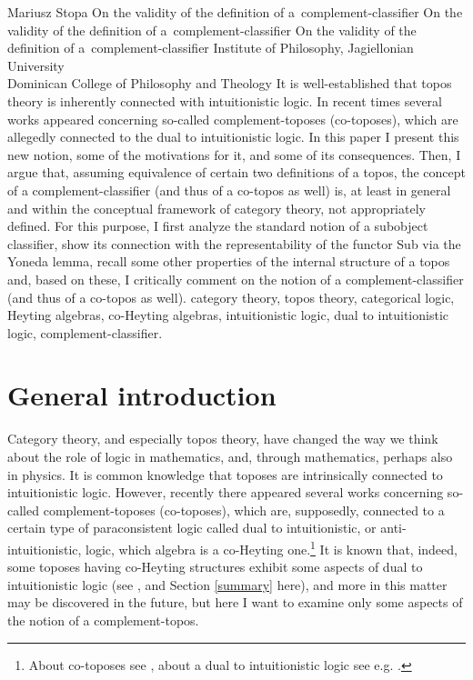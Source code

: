 

\begin{artengenv}{Mariusz Stopa}
	{On the validity of the definition of a~complement-classifier}
	{On the validity of the definition of a~complement-classifier}
	{On the validity of the definition of a~complement-classifier}
	{Institute of Philosophy, Jagiellonian University\\Dominican College of Philosophy and Theology}
	{It is well-established that topos theory is inherently connected with intuitionistic logic. In recent times several works appeared concerning so-called com\-ple\-ment-toposes (co-toposes), which are allegedly connected to the dual to intuitionistic logic. In this paper I present this new notion, some of the motivations for it, and some of its consequences. Then, I argue that, assuming equivalence of certain two definitions of a topos, the concept of a complement-classifier (and thus of a co-topos as well) is, at least in general and within the conceptual framework of category theory, not appropriately defined. For this purpose, I first analyze the standard notion of a subobject classifier, show its connection with the representability of the functor \textsf{Sub} via the Yoneda lemma, recall some other properties of the internal structure of a topos and, based on these, I critically comment on the notion of a complement-classifier (and thus of a co-topos as well).}
	{category theory, topos theory, categorical logic, Heyting algebras, co-Heyting algebras, in\-tu\-itionistic logic, dual to in\-tu\-itionistic logic, complement-clas\-si\-fier.}


\section{General introduction} \label{intro}


\lettrine[loversize=0.13,lines=2,lraise=-0.03,nindent=0em,findent=0.2pt]%
{C}{}ategory theory, and especially topos theory, have changed the way we think about the role of logic in mathematics, and, through mathematics, perhaps also in physics. It is common knowledge that toposes are intrinsically connected to intuitionistic logic. However, recently there appeared several works concerning so-called com\-ple\-ment-toposes (co-toposes), which are, supposedly, connected to a certain type of paraconsistent logic called dual to intuitionistic, or anti-intuitionistic, logic, which algebra is a co-Heyting one.\footnote{About co-toposes see \parencite{mortensen-1995,mortensen-2003,james-phd-1996,estrada-gonzalez-2010,estrada-gonzalez-2015}, about a dual to intuitionistic logic see e.g. \parencite{goodman-1981, czermak-1977, urbas-1996, kamide-2003}.} It is known that, indeed, some toposes having co-Heyting structures exhibit some aspects of dual to intuitionistic logic (see \parencite{reyes-zolfaghari-1996}, and Section \ref{summary} here), and more in this matter may be discovered in the future, but here I want to examine only some aspects of the notion of a com\-ple\-ment-topos.


\end{artengenv}
